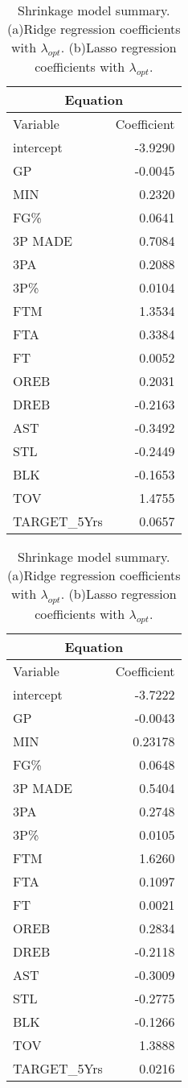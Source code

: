 \begin{table}[H]
	\begin{subtable}[h]{0.4\textwidth}
		\centering
		\begin{tabular}{|| l | r ||} 
			\hline
			\multicolumn{2}{|c|}{Equation} \\
			\hline
			Variable & Coefficient \\
			\hline
			intercept & -3.9290 \\
			GP & -0.0045 \\
			MIN & 0.2320 \\
			FG\% & 0.0641 \\
			3P MADE & 0.7084 \\
			3PA & 0.2088 \\
			3P\% & 0.0104 \\
			FTM & 1.3534 \\
			FTA & 0.3384 \\
			FT & 0.0052 \\
			OREB & 0.2031 \\
			DREB & -0.2163 \\
			AST & -0.3492 \\			
			STL & -0.2449 \\
			BLK & -0.1653 \\
			TOV & 1.4755 \\
			TARGET\_5Yrs & 0.0657 \\				
			\hline
		\end{tabular}
		\caption{}
		\label{table:FinalRidgeCoef}
	\end{subtable}
	\hfill
	\begin{subtable}[h]{0.4\textwidth}
		\centering
		\begin{tabular}{|| l | r ||} 
			\hline
			\multicolumn{2}{|c|}{Equation} \\
			\hline
			Variable & Coefficient \\
			\hline
			intercept & -3.7222 \\
			GP & -0.0043 \\
			MIN & 0.23178 \\
			FG\% & 0.0648 \\ 
			3P MADE & 0.5404 \\ 
			3PA & 0.2748 \\ 
			3P\% & 0.0105 \\
			FTM & 1.6260 \\ 
			FTA & 0.1097 \\ 
			FT & 0.0021 \\ 
			OREB & 0.2834 \\ 
			DREB & -0.2118 \\
			AST & -0.3009 \\
			STL & -0.2775 \\
			BLK & -0.1266 \\
			TOV & 1.3888 \\ 
			TARGET\_5Yrs & 0.0216 \\				
			\hline
		\end{tabular}
		\caption{}
		\label{table:FinalLassoCoef}
	\end{subtable}
	\caption{Shrinkage model summary. (a)Ridge regression coefficients with $\lambda_{opt}$. (b)Lasso regression coefficients with $\lambda_{opt}$.}
	\label{table:RegModSum}
\end{table}
